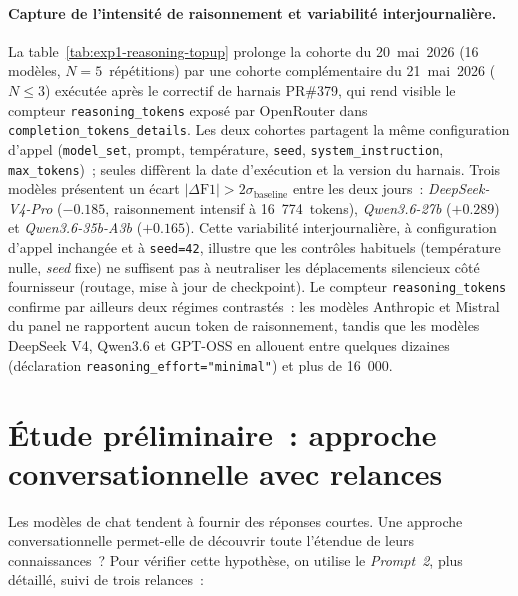 \documentclass[a4paper,11pt]{report}
\begin{document}
\paragraph{Capture de l'intensité de raisonnement et variabilité interjournalière.}
La table~\ref{tab:exp1-reasoning-topup} prolonge la cohorte du 20~mai~2026 (16 modèles, $N{=}5$~répétitions) par une cohorte complémentaire du 21~mai~2026 ($N{\leq}3$) exécutée après le correctif de harnais PR\#379, qui rend visible le compteur \texttt{reasoning\_tokens} exposé par OpenRouter dans \texttt{completion\_tokens\_details}. Les deux cohortes partagent la même configuration d'appel (\texttt{model\_set}, prompt, température, \texttt{seed}, \texttt{system\_instruction}, \texttt{max\_tokens})~; seules diffèrent la date d'exécution et la version du harnais. Trois modèles présentent un écart $|\Delta\text{F1}| > 2\sigma_{\text{baseline}}$ entre les deux jours~: \emph{DeepSeek-V4-Pro} ($-0.185$, raisonnement intensif à 16~774~tokens), \emph{Qwen3.6-27b} ($+0.289$) et \emph{Qwen3.6-35b-A3b} ($+0.165$). Cette variabilité interjournalière, à configuration d'appel inchangée et à \texttt{seed=42}, illustre que les contrôles habituels (température nulle, \emph{seed} fixe) ne suffisent pas à neutraliser les déplacements silencieux côté fournisseur (routage, mise à jour de checkpoint). Le compteur \texttt{reasoning\_tokens} confirme par ailleurs deux régimes contrastés~: les modèles Anthropic et Mistral du panel ne rapportent aucun token de raisonnement, tandis que les modèles DeepSeek V4, Qwen3.6 et GPT-OSS en allouent entre quelques dizaines (déclaration \texttt{reasoning\_effort="minimal"}) et plus de 16~000.



\section{Étude préliminaire~: approche conversationnelle avec relances}\label{sec:exp2}

Les modèles de chat tendent à fournir des réponses courtes. Une approche conversationnelle permet-elle de découvrir toute l'étendue de leurs connaissances~? Pour vérifier cette hypothèse, on utilise le \emph{Prompt~2}\label{sec:methode}, plus détaillé, suivi de trois relances~:
\end{document}
